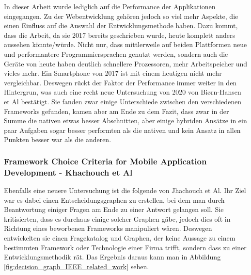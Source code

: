 In dieser Arbeit wurde lediglich auf die Performance der Applikationen eingegangen. Zu der Webentwicklung gehören jedoch so viel mehr Aspekte, die einen Einfluss auf die Auswahl der Entwicklungsmethode haben. Dazu kommt, dass die Arbeit, da sie 2017 bereits geschrieben wurde, heute komplett anders aussehen könnte/würde. Nicht nur, dass mittlerweile auf beiden Plattformen neue und performantere Programmiersprachen genutzt werden, sondern auch die Geräte von heute haben deutlich schnellere Prozessoren, mehr Arbeitspeicher und vieles mehr. Ein Smartphone von 2017 ist mit einem heutigen nicht mehr vergleichbar. Deswegen rückt der Faktor der Performance immer weiter in den Hintergrun, was auch eine recht neue Untersuchung von 2020 von Bi{\o}rn-Hansen et Al bestätigt. Sie fanden zwar einige Unterschiede zwischen den verschiedenen Frameworks gefunden, kamen aber am Ende zu dem Fazit, dass zwar in der Summe die nativen etwas besser Abschnitten, aber einige hybriden Ansätze in ein paar Aufgaben sogar besser performten als die nativen und kein Ansatz in allen Punkten besser war als die anderen.\cite{BirnHansen.2020}

\subsubsection{Framework Choice Criteria for Mobile Application Development - Khachouch et Al}
Ebenfalls eine neuere Untersuchung ist die folgende von Jhachouch et Al. Ihr Ziel war es dabei einen Entscheidungsgraphen zu erstellen, bei dem man durch Beantwortung einiger Fragen am Ende zu einer Antwort gelangen soll. Sie kritisierten, dass es durchaus einige solcher Graphen gäbe, jedoch dies oft in Richtung eines beworbenen Frameworks manipuliert wären. Deswegen entwickelten sie einen Fragekatalog und Graphen, der keine Aussage zu einem bestimmten Framework oder Technologie einer Firma trifft, sondern dass zu einer Entwicklungsmethodik rät. Das Ergebnis daraus kann man in Abbildung \ref{fig:decision_graph_IEEE_related_work} sehen.\cite{IEEE_Khackouch_Al}

